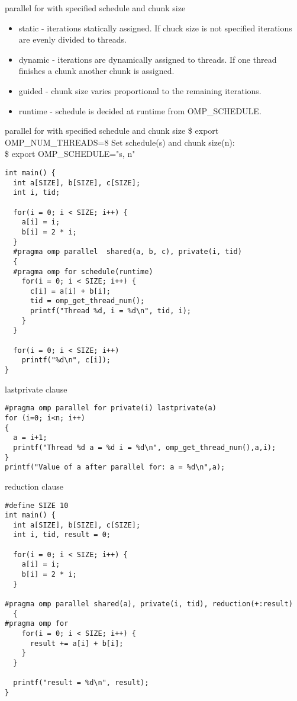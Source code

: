 \documentclass[10pt]{beamer}
\begin{document}
\begin{frame}[fragile]{parallel for with specified schedule and chunk size}
\begin{itemize}
\item static - iterations statically assigned. If chuck size is not specified
iterations are evenly divided to threads.
\item dynamic - iterations are dynamically assigned to threads. If one thread
finishes a chunk another chunk is assigned.
\item guided - chunk size varies proportional to the remaining iterations.
\item runtime - schedule is decided at runtime from OMP\_SCHEDULE.
\end{itemize}
\end{frame}

\begin{frame}{parallel for with specified schedule and chunk size}
\$ export OMP\_NUM\_THREADS=8
Set schedule(s) and chunk size(n):\\
\$ export OMP\_SCHEDULE="s, n"
\begin{Verbatim}[fontsize=\small, formatcom=\color{red}]
int main() {
  int a[SIZE], b[SIZE], c[SIZE];
  int i, tid;

  for(i = 0; i < SIZE; i++) {
    a[i] = i;
    b[i] = 2 * i;
  }
  #pragma omp parallel  shared(a, b, c), private(i, tid)
  {
  #pragma omp for schedule(runtime)
    for(i = 0; i < SIZE; i++) {
      c[i] = a[i] + b[i];
      tid = omp_get_thread_num();
      printf("Thread %d, i = %d\n", tid, i);
    }
  }

  for(i = 0; i < SIZE; i++)
    printf("%d\n", c[i]);
}
\end{Verbatim}
\end{frame}

\begin{frame}[fragile]{lastprivate clause}
\begin{Verbatim}[fontsize=\small, formatcom=\color{red}]
#pragma omp parallel for private(i) lastprivate(a)
for (i=0; i<n; i++)
{
  a = i+1;
  printf("Thread %d a = %d i = %d\n", omp_get_thread_num(),a,i);
}
printf("Value of a after parallel for: a = %d\n",a);
\end{Verbatim}
\end{frame}

\begin{frame}[fragile]{reduction clause}
\begin{Verbatim}[fontsize=\small, formatcom=\color{red}]
#define SIZE 10
int main() {
  int a[SIZE], b[SIZE], c[SIZE];
  int i, tid, result = 0;

  for(i = 0; i < SIZE; i++) {
    a[i] = i;
    b[i] = 2 * i;
  }

#pragma omp parallel shared(a), private(i, tid), reduction(+:result)
  {
#pragma omp for
    for(i = 0; i < SIZE; i++) {
      result += a[i] + b[i];
    }
  }

  printf("result = %d\n", result);
}
\end{Verbatim}
\end{frame}
\end{document}
